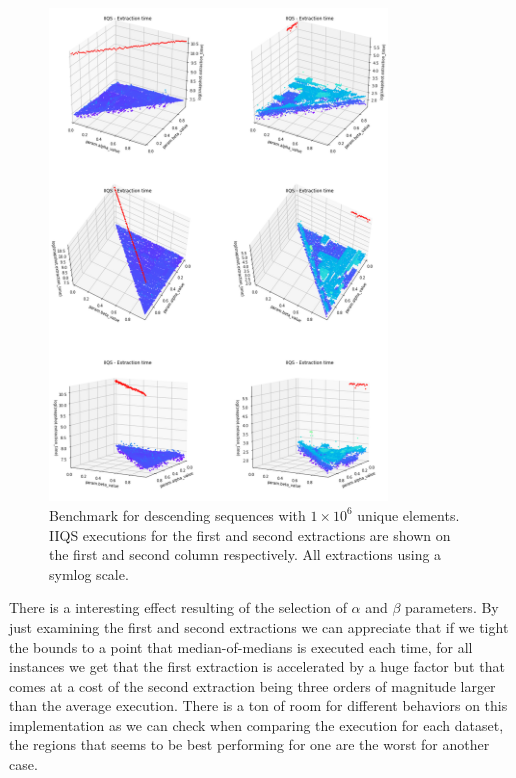 \begin{figure}[!ht]
    \centering
    \includegraphics[width=0.8\textwidth]{./fragments/04_experimental_execution/images/04_alphabeta_singleclass_desc.png}
    \caption{Benchmark for descending sequences with $1\times10^6$ unique elements. IIQS executions for the first and second extractions are shown on the first and second column respectively. All extractions using a symlog scale.}
    \label{FIG:05_ALPHABETA_RELATIONSHIP_DESC}
\end{figure}


There is a interesting effect resulting of the selection of $\alpha$ and $\beta$ parameters. By just examining the first and second extractions we can appreciate that if we tight the bounds to a point that median-of-medians is executed each time, for all instances we get that the first extraction is accelerated by a huge factor but that comes at a cost of the second extraction being three orders of magnitude larger than the average execution. There is a ton of room for different behaviors on this implementation as we can check when comparing the execution for each dataset, the regions that seems to be best performing for one are the worst for another case.

